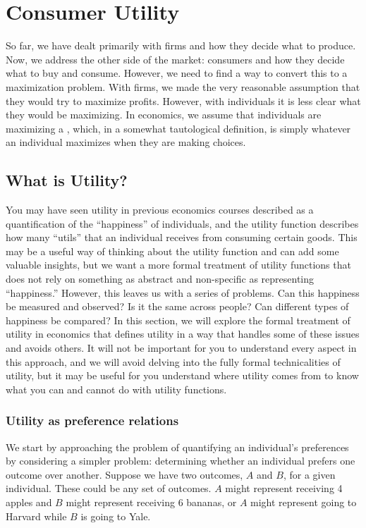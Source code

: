 \chapter{Consumer Utility}
So far, we have dealt primarily with firms and how they decide what to produce. Now, we address the other side of the market: consumers and how they decide what to buy and consume. However, we need to find a way to convert this to a maximization problem. With firms, we made the very reasonable assumption that they would try to maximize profits. However, with individuals it is less clear what they would be maximizing. In economics, we assume that individuals are maximizing a , which, in a somewhat tautological definition, is simply whatever an individual maximizes when they are making choices. 

\section{What is Utility?}
You may have seen utility in previous economics courses described as a quantification of the ``happiness'' of individuals, and the utility function describes how many ``utils'' that an individual receives from consuming certain goods. This may be a useful way of thinking about the utility function and can add some valuable insights, but we want a more formal treatment of utility functions that does not rely on something as abstract and non-specific as representing ``happiness.'' However, this leaves us with a series of problems. Can this happiness be measured and observed? Is it the same across people? Can different types of happiness be compared? In this section, we will explore the formal treatment of utility in economics that defines utility in a way that handles some of these issues and avoids others. It will not be important for you to understand every aspect in this approach, and we will avoid delving into the fully formal technicalities of utility, but it may be useful for you understand where utility comes from to know what you can and cannot do with utility functions.

\subsection*{Utility as preference relations}
We start by approaching the problem of quantifying an individual's preferences by considering a simpler problem: determining whether an individual prefers one outcome over another. Suppose we have two outcomes, $A$ and $B$, for a given individual. These could be any set of outcomes. $A$ might represent receiving 4 apples and $B$ might represent receiving 6 bananas, or $A$ might represent going to Harvard while $B$ is going to Yale.

